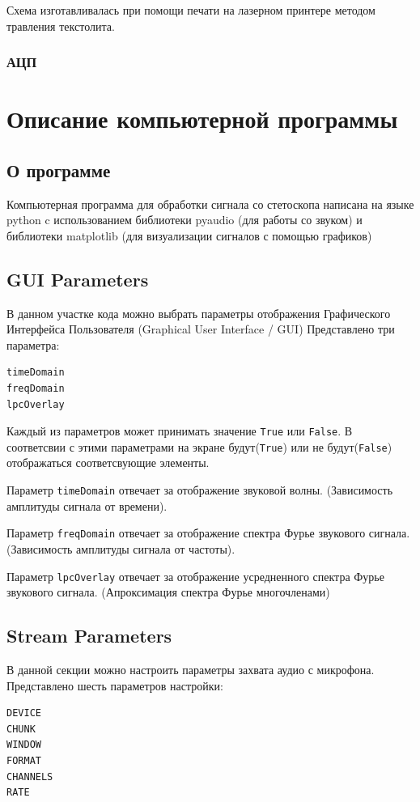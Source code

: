 Схема изготавливалась при помощи печати на лазерном принтере методом травления текстолита. 
\subsubsection{АЦП}
\newpage
\section{Описание компьютерной программы}
\subsection{О программе}
Компьютерная программа для обработки сигнала со стетоскопа написана на языке python c использованием библиотеки pyaudio (для работы со звуком) и библиотеки matplotlib (для визуализации сигналов с помощью графиков)
\subsection{GUI Parameters}
В данном участке кода можно выбрать параметры отображения Графического Интерфейса Пользователя (Graphical User Interface / GUI)
Представлено три параметра:
\begin{verbatim}
timeDomain
freqDomain
lpcOverlay
\end{verbatim}

Каждый из параметров может принимать значение \verb|True| или \verb|False|. В соответсвии с этими параметрами на экране будут(\verb|True|) или не будут(\verb|False|) отображаться соответсвующие элементы.

Параметр \verb|timeDomain| отвечает за отображение звуковой волны. (Зависимость амплитуды сигнала от времени). 

Параметр \verb|freqDomain| отвечает за отображение спектра Фурье звукового сигнала. (Зависимость амплитуды сигнала от частоты). 

Параметр \verb|lpcOverlay| отвечает за отображение усредненного спектра Фурье звукового сигнала. (Апроксимация спектра Фурье многочленами)

\subsection{Stream Parameters}
В данной секции можно настроить параметры захвата аудио с микрофона. Представлено шесть параметров настройки:
\begin{verbatim}
DEVICE
CHUNK
WINDOW
FORMAT
CHANNELS
RATE
\end{verbatim}

